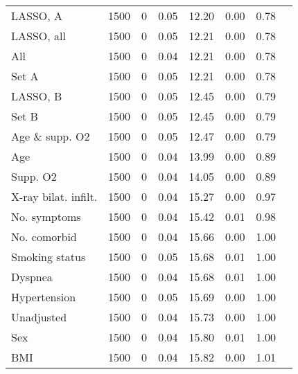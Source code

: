 \documentclass{article}
\begin{document}
{\begin{longtable}{lccccccc}
LASSO, A & 1500 & 0 & 0.05 & 12.20 & 0.00 & 0.78\\
LASSO, all & 1500 & 0 & 0.05 & 12.21 & 0.00 & 0.78\\
All & 1500 & 0 & 0.04 & 12.21 & 0.00 & 0.78\\
Set A & 1500 & 0 & 0.05 & 12.21 & 0.00 & 0.78\\
LASSO, B & 1500 & 0 & 0.05 & 12.45 & 0.00 & 0.79\\
Set B & 1500 & 0 & 0.05 & 12.45 & 0.00 & 0.79\\
Age \& supp. O2 & 1500 & 0 & 0.05 & 12.47 & 0.00 & 0.79\\
Age & 1500 & 0 & 0.04 & 13.99 & 0.00 & 0.89\\
Supp. O2 & 1500 & 0 & 0.04 & 14.05 & 0.00 & 0.89\\
X-ray bilat. infilt. & 1500 & 0 & 0.04 & 15.27 & 0.00 & 0.97\\
No. symptoms & 1500 & 0 & 0.04 & 15.42 & 0.01 & 0.98\\
No. comorbid & 1500 & 0 & 0.04 & 15.66 & 0.00 & 1.00\\
Smoking status & 1500 & 0 & 0.05 & 15.68 & 0.01 & 1.00\\
Dyspnea & 1500 & 0 & 0.04 & 15.68 & 0.01 & 1.00\\
Hypertension & 1500 & 0 & 0.05 & 15.69 & 0.00 & 1.00\\
Unadjusted & 1500 & 0 & 0.04 & 15.73 & 0.00 & 1.00\\
Sex & 1500 & 0 & 0.04 & 15.80 & 0.01 & 1.00\\
BMI & 1500 & 0 & 0.04 & 15.82 & 0.00 & 1.01\\
\bottomrule
\hline
\end{longtable}
}

\clearpage
\end{document}

